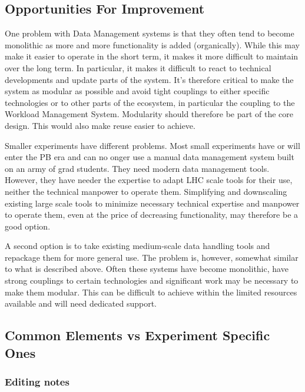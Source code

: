 \subsection{Opportunities For Improvement}
One problem with Data Management systems is that they often tend to become monolithic as more and more functionality is 
added (organically). While this may make it easier to operate in the short term, it makes it more difficult to maintain over 
the long term. In particular, it makes it difficult to react to technical developments and update parts of the system. It's 
therefore critical to make the system as modular as possible and avoid tight couplings to either specific technologies or 
to other parts of the ecosystem, in particular the coupling to the Workload Management System. Modularity should therefore be 
part of the core design. This would also make reuse easier to achieve. 
\par Smaller experiments have different problems. Most small experiments have or will enter the PB era and can no onger use a manual 
data management system built on an army of grad students. They need modern data management tools. However, they have needer the 
expertise to adapt LHC scale tools for their use, neither the technical manpower to operate them. Simplifying and downscaling existing 
large scale tools to minimize necessary technical expertise and manpower to operate them, even at the price of decreasing functionality, 
may therefore be a good option. 
\par A second option is to take existing medium-scale data handling tools and repackage them for more general use. The problem is, 
however, somewhat similar to what is described above. Often these systems have become monolithic, have strong couplings to certain 
technologies and significant work may be 
necessary to make them modular. This can be difficult to achieve within the limited resources available and will need dedicated support.






\subsection{Common Elements vs Experiment Specific Ones}



\subsubsection{Editing notes}

